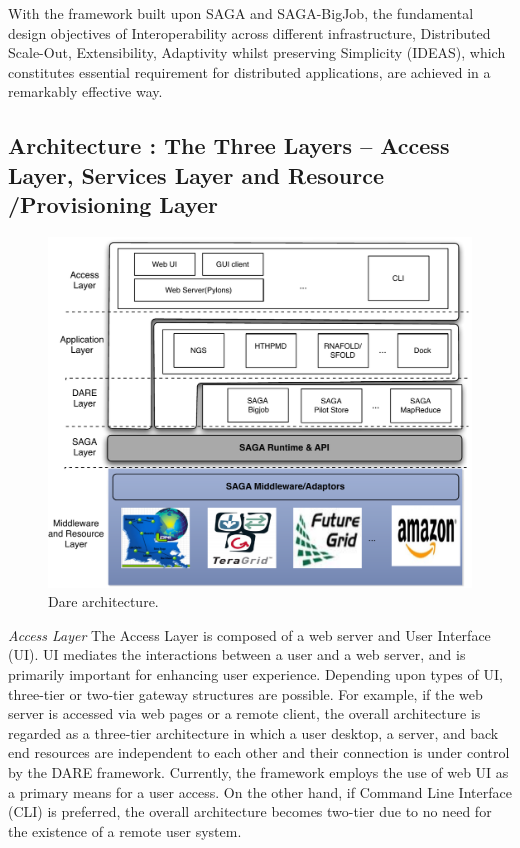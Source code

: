 \documentclass{sig-alternate}
\begin{document}
With the framework built upon SAGA and SAGA-BigJob, the fundamental design objectives of Interoperability across different infrastructure, Distributed Scale-Out, Extensibility, Adaptivity whilst preserving Simplicity (IDEAS), which constitutes essential requirement for distributed applications, are achieved in a remarkably effective way.


\subsection{Architecture : The Three Layers -- Access Layer, Services Layer and Resource /Provisioning Layer}

\begin{figure}
 \centering
\includegraphics[scale=0.40]{figures/DAREOutline.pdf}

\caption{\small Dare architecture.}
  \label{fig:dare-arch} 
\end{figure}

 

%


\textit{Access Layer}  The Access Layer is composed of a web server and User Interface (UI).  UI mediates the interactions between a user and a web server, and is primarily important for enhancing user experience.  Depending upon types of UI, three-tier or two-tier gateway structures are possible.  For example, if the web server is accessed via web pages or a remote client, the overall architecture is regarded as a three-tier architecture in which a user desktop, a server, and back end resources are independent to each other and their connection is under control by the DARE framework.  Currently, the framework employs the use of web UI as a primary means for a user access.  On the other hand, if Command Line Interface (CLI) is preferred, the overall architecture becomes two-tier due to no need for the existence of a remote user system.  
\end{document}
